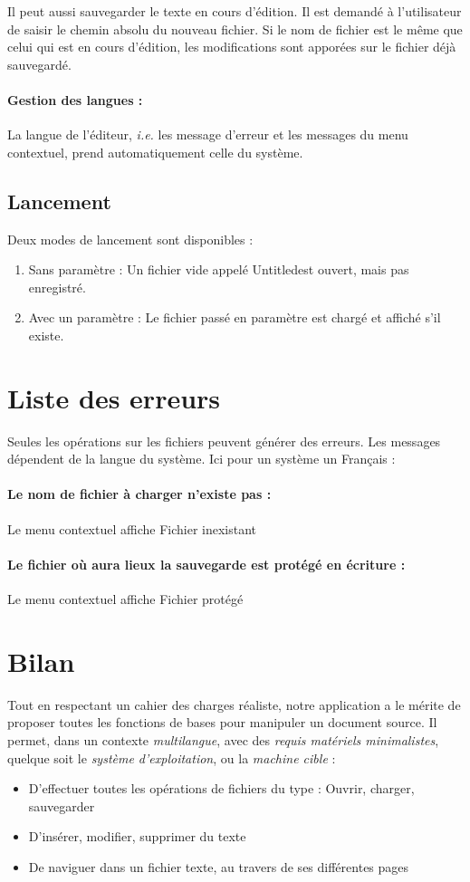 Il peut aussi sauvegarder le texte en cours d'édition. Il est demandé à l'utilisateur de saisir le chemin absolu du nouveau fichier. Si le nom de fichier est le même que celui qui est en cours d'édition, les modifications sont apporées sur le fichier déjà sauvegardé.

\paragraph{Gestion des langues :}
La langue de l'éditeur, \textsl{i.e.} les message d'erreur et les messages du menu contextuel, prend automatiquement celle du système.

\subsection{Lancement}
Deux modes de lancement sont disponibles :
\begin{enumerate}
	\item Sans paramètre : Un fichier vide appelé \og Untitled\fg est ouvert, mais pas enregistré.
	\item Avec un paramètre : Le fichier passé en paramètre est chargé et affiché s'il existe.
\end{enumerate}

\section{Liste des erreurs}
Seules les opérations sur les fichiers peuvent générer des erreurs. Les messages dépendent de la langue du système. Ici pour un système un Français :

\paragraph{Le nom de fichier à charger n'existe pas :} Le menu contextuel affiche \og Fichier inexistant\fg
\paragraph{Le fichier où aura lieux la sauvegarde est protégé en écriture :} Le menu contextuel affiche \og Fichier protégé\fg

\section{Bilan}
Tout en respectant un cahier des charges réaliste, notre application a le mérite de proposer toutes les fonctions de bases pour manipuler un document source. Il permet, dans un contexte \emph{multilangue}, avec des \emph{requis matériels minimalistes}, quelque soit le \emph{système d'exploitation}, ou la \emph{machine cible} :
\begin{itemize}
	\item D'effectuer toutes les opérations de fichiers du type : Ouvrir, charger, sauvegarder
	\item D'insérer, modifier, supprimer du texte
	\item De naviguer dans un fichier texte, au travers de ses différentes pages
\end{itemize}
